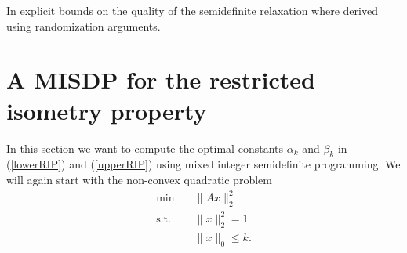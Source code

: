 \documentclass[journal]{IEEEtran}
\newcommand{\Norm}[2]{\lVert{#1}\rVert_{#2}}
\newcommand{\T}{^{\top}}
\begin{document}
In \cite{AspBG14} explicit bounds on the quality of the semidefinite relaxation where derived using randomization arguments.
 


\section{A MISDP for the restricted isometry property}
\label{sec:MISDP}

In this section we want to compute the optimal constants $\alpha_k$ and $\beta_k$ in (\ref{lowerRIP}) and (\ref{upperRIP}) using mixed integer semidefinite programming. We will again start with the non-convex quadratic problem
\begin{align}\label{QP2}
 \min \quad & \Norm{Ax}{2}^2 \nonumber \\
 \text{s.t.} \quad & \Norm{x}{2}^2 = 1 \tag{QP} \\
 & \Norm{x}{0} \leq k. \nonumber
\end{align}
\end{document}
